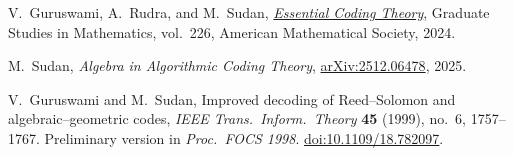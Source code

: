 	
	\pagebreak
	
	\pagestyle{fancy}
	
	\newpage
	
	
	
	
	\newpage
	
	
	
	\newpage
	
	
	
	\thispagestyle{empty}
	\begin{thebibliography}{}
		
		V.~Guruswami, A.~Rudra, and M.~Sudan, \href{https://cse.buffalo.edu/faculty/atri/courses/coding-theory/book/}{\emph{Essential Coding Theory}}, 
		Graduate Studies in Mathematics, vol.~226, American Mathematical Society, 2024.
		
		M.~Sudan,
			\emph{Algebra in Algorithmic Coding Theory},
		\href{https://arxiv.org/pdf/2512.06478}{	arXiv:2512.06478}, 2025.
		
		V.~Guruswami and M.~Sudan,
		Improved decoding of Reed--Solomon and algebraic--geometric codes,
		\textit{IEEE Trans.\ Inform.\ Theory} \textbf{45} (1999), no.~6, 1757--1767.
		Preliminary version in \textit{Proc.\ FOCS 1998}.
		\href{https://doi.org/10.1109/18.782097}{doi:10.1109/18.782097}.
		
	\end{thebibliography}
	

